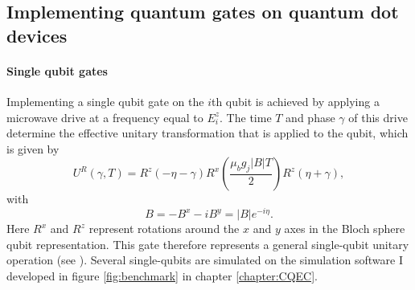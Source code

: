 \documentclass{report}
\begin{document}
\begin{appendices}
\chapter{Implementing quantum gates on quantum dot devices} \label{appendix:gates}
\subsubsection{Single qubit gates}
Implementing a single qubit gate on the $i$th qubit is achieved by applying a microwave drive at a frequency equal to $E^z_i$. The time $T$ and phase $\gamma$ of this drive determine the effective unitary transformation that is applied to the qubit, which is given by
\begin{equation*}
    U^R(\gamma, T) = R^z(-\eta-\gamma)R^x(\frac{\mu_b g_j |B|T}{2})R^z(\eta+\gamma),
\end{equation*}
with
\begin{equation*}
    B = -B^x - iB^y = |B|e^{-i\eta}.
\end{equation*} Here $R^x$ and $R^z$ represent rotations around the $x$ and $y$ axes in the Bloch sphere qubit representation. This gate therefore represents a general single-qubit unitary operation (see \cite{Nielsen2010}). Several single-qubits are simulated on the simulation software I developed in figure \ref{fig:benchmark} in chapter \ref{chapter:CQEC}.

\end{appendices}
\end{document}
